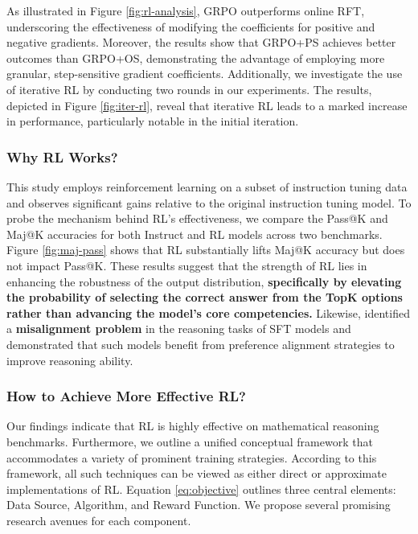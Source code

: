 As illustrated in Figure \ref{fig:rl-analysis}, GRPO outperforms online RFT, underscoring the effectiveness of modifying the coefficients for positive and negative gradients. Moreover, the results show that GRPO+PS achieves better outcomes than GRPO+OS, demonstrating the advantage of employing more granular, step-sensitive gradient coefficients. Additionally, we investigate the use of iterative RL by conducting two rounds in our experiments. The results, depicted in Figure \ref{fig:iter-rl}, reveal that iterative RL leads to a marked increase in performance, particularly notable in the initial iteration.

\subsubsection{Why RL Works?} This study employs reinforcement learning on a subset of instruction tuning data and observes significant gains relative to the original instruction tuning model. To probe the mechanism behind RL’s effectiveness, we compare the Pass@K and Maj@K accuracies for both Instruct and RL models across two benchmarks. Figure \ref{fig:maj-pass} shows that RL substantially lifts Maj@K accuracy but does not impact Pass@K. These results suggest that the strength of RL lies in enhancing the robustness of the output distribution, \textbf{specifically by elevating the probability of selecting the correct answer from the TopK options rather than advancing the model’s core competencies.} Likewise, \citep{wang2023making} identified a \textbf{misalignment problem} in the reasoning tasks of SFT models and demonstrated that such models benefit from preference alignment strategies \citep{yuan2023rrhf,song2023preference,wang2023making} to improve reasoning ability.

\subsubsection{How to Achieve More Effective RL?}
\label{sec:effec_rl}
Our findings indicate that RL is highly effective on mathematical reasoning benchmarks. Furthermore, we outline a unified conceptual framework that accommodates a variety of prominent training strategies. According to this framework, all such techniques can be viewed as either direct or approximate implementations of RL. Equation \ref{eq:objective} outlines three central elements: Data Source, Algorithm, and Reward Function. We propose several promising research avenues for each component.

